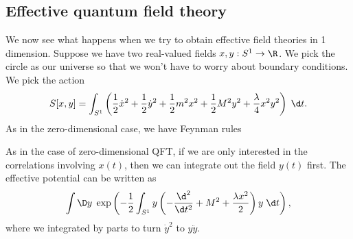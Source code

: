 \documentclass[a4paper]{article}
\begin{document}
\subsection{Effective quantum field theory}
We now see what happens when we try to obtain effective field theories in 1 dimension. Suppose we have two real-valued fields $x, y: S^1 \to \R$. We pick the circle as our universe so that we won't have to worry about boundary conditions. We pick the action
\[
  S[x, y] = \int_{S^1} \left(\frac{1}{2} \dot{x}^2 + \frac{1}{2} \dot{y}^2 + \frac{1}{2} m^2 x^2 + \frac{1}{2}M^2 y^2 + \frac{\lambda}{4} x^2y^2 \right)\;\d t.
\]
As in the zero-dimensional case, we have Feynman rules
\begin{center}
  \quad\quad
  \quad\quad
\end{center}
As in the case of zero-dimensional QFT, if we are only interested in the correlations involving $x(t)$, then we can integrate out the field $y(t)$ first. The effective potential can be written as
\[
  \int \D y\; \exp\left(-\frac{1}{2} \int_{S^1} y\left(-\frac{\d^2}{\d t^2} + M^2 + \frac{\lambda x^2}{2}\right) y \;\d t\right),
\]
where we integrated by parts to turn $\dot{y}^2$ to $y \ddot{y}$.
\end{document}
